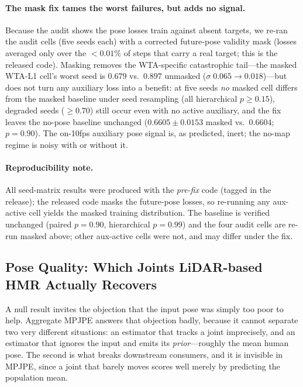 \documentclass{article} %
\begin{document}
\paragraph{The mask fix tames the worst failures, but adds no signal.} Because the
audit shows the pose losses train against absent targets, we re-ran the audit cells
(five seeds each) with a corrected future-pose validity mask (losses averaged only
over the $<{0.01\%}$ of steps that carry a real target; this is the released code).
Masking removes the WTA-specific catastrophic tail---the masked WTA-L1 cell's worst
seed is $0.679$ vs.\ $0.897$ unmasked ($\sigma\; 0.065{\to}0.018$)---but does not
turn any auxiliary loss into a benefit: at five seeds \emph{no} masked cell differs
from the masked baseline under seed resampling (all hierarchical $p{\geq}0.15$),
degraded seeds ($\geq 0.70$) still occur even with no active auxiliary, and the fix
leaves the no-pose baseline unchanged ($0.6605 \pm 0.0153$ masked vs.\ $0.6604$;
$p{=}0.90$). The on-10fps auxiliary pose signal is, as predicted, inert; the no-map
regime is noisy with or without it.

\paragraph{Reproducibility note.} All seed-matrix results were produced with the
\emph{pre-fix} code (tagged in the release); the released code masks the future-pose
losses, so re-running any aux-active cell yields the masked training distribution.
The baseline is verified unchanged (paired $p{=}0.90$, hierarchical $p{=}0.99$) and the four audit cells are re-run
masked above; other aux-active cells were not, and may differ under the fix.

\subsection{Pose Quality: Which Joints LiDAR-based HMR Actually Recovers}
\label{sec:recoverability}

A null result invites the objection that the input pose was simply too poor to
help. Aggregate MPJPE answers that objection badly, because it cannot separate two
very different situations: an estimator that tracks a joint imprecisely, and an
estimator that ignores the input and emits its \emph{prior}---roughly the mean
human pose. The second is what breaks downstream consumers, and it is invisible in
MPJPE, since a joint that barely moves scores well merely by predicting the
population mean.
\end{document}
